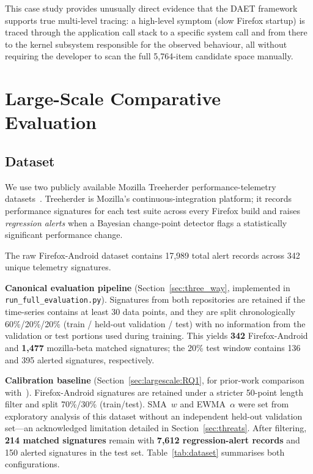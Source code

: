 \documentclass[a4paper,fleqn]{cas-sc}
\theoremstyle{plain}
\begin{document}
This case study provides unusually direct evidence that the DAET framework
supports true multi-level tracing: a high-level symptom (slow Firefox startup)
is traced through the application call stack to a specific system call and from
there to the kernel subsystem responsible for the observed behaviour, all
without requiring the developer to scan the full 5,764-item candidate space
manually.

\section{Large-Scale Comparative Evaluation}\label{sec:largescale}

\subsection{Dataset}\label{sec:largescale:dataset}

We use two publicly available Mozilla Treeherder performance-telemetry
datasets~\cite{mozillatreeherder}.
Treeherder is Mozilla's continuous-integration platform; it records
performance signatures for each test suite across every Firefox build
and raises \emph{regression alerts} when a Bayesian change-point detector
flags a statistically significant performance change.

The raw Firefox-Android dataset contains 17,989 total alert records across
342 unique telemetry signatures.

\textbf{Canonical evaluation pipeline} (Section~\ref{sec:three_way},
implemented in \texttt{run\_full\_evaluation.py}).
Signatures from both repositories are retained if the time-series contains
at least 30 data points, and they are split chronologically 60\%/20\%/20\%
(train / held-out validation / test) with no information from the validation
or test portions used during training.
This yields \textbf{342} Firefox-Android and \textbf{1{,}477} mozilla-beta
matched signatures; the 20\% test window contains 136 and 395 alerted
signatures, respectively.

\textbf{Calibration baseline} (Section~\ref{sec:largescale:RQ1},
for prior-work comparison with~\cite{10197790}).
Firefox-Android signatures are retained under a stricter 50-point length
filter and split 70\%/30\% (train/test).
SMA~$w$ and EWMA~$\alpha$ were set from exploratory analysis of this
dataset without an independent held-out validation set---an acknowledged
limitation detailed in Section~\ref{sec:threats}.
After filtering, \textbf{214 matched signatures} remain with
\textbf{7,612 regression-alert records} and 150 alerted signatures in the
test set.
Table~\ref{tab:dataset} summarises both configurations.
\end{document}
